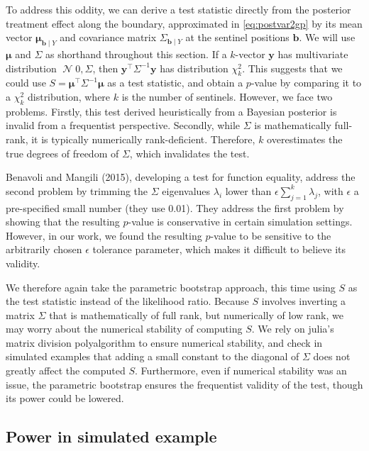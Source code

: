 \documentclass[letter]{article}
\DeclareMathOperator{\normal}{\mathcal{N}}
\newcommand{\trans}{^{\intercal}}
\newcommand{\yvec}{\mathbold{y}}
\newcommand{\muvec}{\mathbold{\mu}}
\newcommand{\sentinels}{\bm{b}}
\begin{document}
To address this oddity, we can derive a test statistic directly from the posterior treatment effect along the boundary,
approximated in \eqref{eq:postvar2gp} by its mean vector \(\muvec_{\sentinels \mid Y}\)
and covariance matrix \(\Sigma_{\sentinels \mid Y}\) at the sentinel positions \(\sentinels\).
We will use \(\muvec\) and \(\Sigma\) as shorthand throughout this section.
If a \(k\)-vector \(\yvec\) has multivariate distribution \(\normal{0, \Sigma}\), then \(\yvec\trans \Sigma^{-1} \yvec\) has distribution \(\chi^2_k\).
This suggests that we could use \(S=\muvec\trans \Sigma^{-1} \muvec\) as a test statistic,
and obtain a \(p\)-value by comparing it to a \(\chi^2_k\) distribution, where \(k\) is the number of sentinels.
However, we face two problems.
Firstly, this test derived heuristically from a Bayesian posterior is invalid from a frequentist perspective.
Secondly, while \(\Sigma\) is mathematically full-rank, it is typically numerically rank-deficient.
Therefore, \(k\) overestimates the true degrees of freedom of \(\Sigma\), which invalidates the test.

Benavoli and Mangili (2015), developing a test for function equality, address the second problem by trimming the \(\Sigma\) eigenvalues \(\lambda_i\) lower than \(\epsilon \sum_{j=1}^k \lambda_j\), with \(\epsilon\) a pre-specified small number (they use 0.01).
They address the first problem by showing that the resulting \(p\)-value is conservative in certain simulation settings.
However, in our work, we found the resulting \(p\)-value to be sensitive to the arbitrarily chosen \(\epsilon\) tolerance parameter, which makes it difficult to believe its validity.

We therefore again take the parametric bootstrap approach, this time using \(S\) as the test statistic instead of the likelihood ratio.
Because \(S\) involves inverting a matrix \(\Sigma\) that is mathematically of full rank, but numerically of low rank, we may worry about the numerical stability of computing \(S\).
We rely on julia's matrix division polyalgorithm to ensure numerical stability,
and check in simulated examples that adding a small constant to the diagonal of \(\Sigma\) does not greatly affect the computed \(S\).
Furthermore, even if numerical stability was an issue,
the parametric bootstrap ensures the frequentist validity of the test,
though its power could be lowered.
    


    	\subsection{Power in simulated example}\label{power-in-simulated-example}
\end{document}
